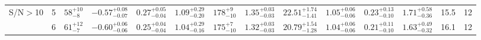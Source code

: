 \begin{table} [h]
\begin{center}
\begin{tabular}{c c c c c c c c c c c c c c}
S/N$>$10 & 5 & $     58 ^{+    10}_{-     8}$ & $  -0.57 ^{+  0.08}_{-  0.07}$ & $   0.27 ^{+  0.05}_{-  0.04}$ & $   1.09 ^{+  0.29}_{-  0.20}$ & $    178 ^{+     9}_{-    10}$ & $   1.35 ^{+  0.03}_{-  0.03}$ & $  22.51 ^{+  1.74}_{-  1.41}$ & $   1.05 ^{+  0.06}_{-  0.06}$ & $   0.23 ^{+  0.13}_{-  0.10}$ & $  1.71 ^{+ 0.58}_{- 0.36}$ &   15.5 & 12 \\ 
& 6 & $     61 ^{+    12}_{-     7}$ & $  -0.60 ^{+  0.06}_{-  0.06}$ & $   0.25 ^{+  0.04}_{-  0.04}$ & $   1.04 ^{+  0.29}_{-  0.16}$ & $    175 ^{+     7}_{-    10}$ & $   1.32 ^{+  0.03}_{-  0.03}$ & $  20.79 ^{+  1.54}_{-  1.28}$ & $   1.04 ^{+  0.06}_{-  0.06}$ & $   0.21 ^{+  0.11}_{-  0.10}$ & $  1.63 ^{+ 0.49}_{- 0.32}$ &   16.1 & 12 \\ 
\hline
\end{tabular}
\end{center}
\end{table}

